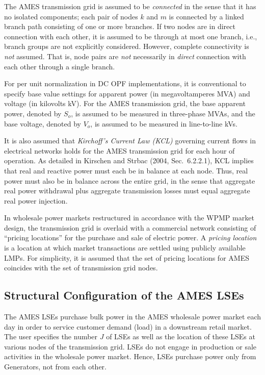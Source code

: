 \documentclass[12pt]{article}
\begin{document}
    The AMES transmission grid is assumed to be
\textit{connected\/} in the sense that it has no isolated components; each
pair of nodes $k$ and $m$ is connected by a linked branch path consisting of one or 
more branches.  If two nodes are in direct connection
with each other, it is assumed to be through at most one branch, i.e., branch groups 
are not explicitly considered.
     However, complete connectivity is \textit{not\/} assumed. 
That is, node pairs are \textit{not\/} necessarily in \textit{direct\/} connection with each other 
through a single branch.  

For per unit normalization in DC OPF implementations, it is conventional to specify base value 
settings for apparent power (in megavoltamperes MVA) and voltage (in kilovolts kV).
For the AMES transmission grid, the base apparent power, denoted by $S_o$, is assumed to be 
measured in three-phase MVAs, and the base voltage, denoted by $V_o$, is assumed to be measured in line-to-line kVs.   

It is also assumed that {\it Kirchoff's Current Law (KCL)\/} governing current flows in electrical networks
holds for the AMES transmission grid for each hour of operation.  As detailed
in Kirschen and Strbac (2004, Sec.~6.2.2.1), KCL implies that real and
reactive power must each be in balance at each node.  Thus, real power must
also be in balance across the entire grid, in the sense that aggregate real
power withdrawal plus aggregate transmission losses must equal aggregate real
power injection.  

In wholesale power markets restructured in accordance with the WPMP market design, 
the transmission grid is overlaid with a commercial 
network consisting of
``pricing locations'' for the purchase and sale of electric power.  A {\it pricing 
location\/} 
is a location at which market transactions are 
settled using publicly available LMPs. 
For simplicity, it is assumed that the set of pricing locations for AMES coincides with the set of 
transmission grid nodes.

\subsection{Structural Configuration of the AMES LSEs \label{LSEConfig} }

\noindent
The AMES LSEs purchase bulk power in the AMES wholesale power market each day in order 
to service customer demand (load) in a downstream retail market.
The user specifies the number $J$ of LSEs as well as the location of these
LSEs at various nodes of the transmission grid.  LSEs do not engage in
production or sale activities in the wholesale power market.  
Hence, LSEs purchase power only from Generators, not from each other.
\end{document}
